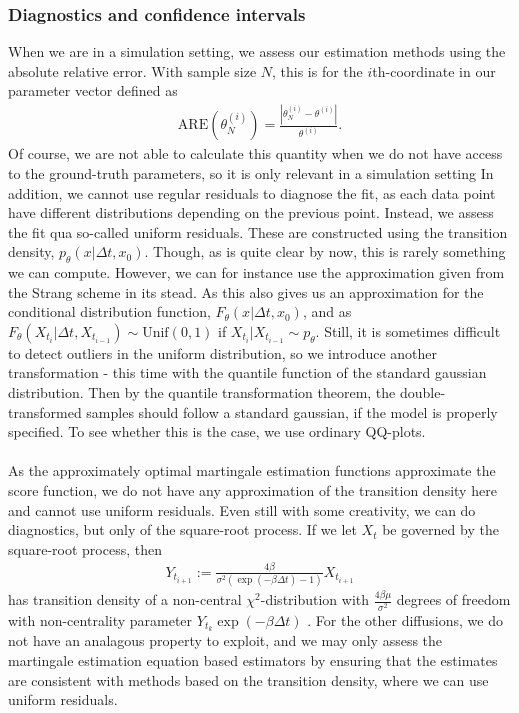 \subsubsection{Diagnostics and confidence intervals}
When we are in a simulation setting, we assess our estimation methods using the absolute relative error. With sample size $N$, this is for the $i$th-coordinate in our parameter vector defined as
\begin{align}
    \mathrm{ARE}\left(\theta_N^{(i)}\right) = \frac{\left|\theta_N^{(i)} - \theta^{(i)}\right|}{\theta^{(i)}}. \label{eq:ARE}
\end{align}
Of course, we are not able to calculate this quantity when we do not have access to the ground-truth parameters, so it is only relevant in a simulation setting In addition, we cannot use regular residuals to diagnose the fit, as each data point have different distributions depending on the previous point. Instead, we assess the fit qua so-called uniform residuals. These are constructed using the transition density, $p_\theta(x|\Delta t, x_0)$. Though, as is quite clear by now, this is rarely something we can compute. However, we can for instance use the approximation given from the Strang scheme in its stead. As this also gives us an approximation for the conditional distribution function, $F_\theta(x|\Delta t, x_0)$, and as $F_\theta(X_{t_{i}}|\Delta t, X_{t_{i - 1}})\sim \mathrm{Unif}(0,1)$ if $X_{t_{i}}|X_{t_{i - 1}} \sim p_\theta$. Still, it is sometimes difficult to detect outliers in the uniform distribution, so we introduce another transformation - this time with the quantile function of the standard gaussian distribution. Then by the quantile transformation theorem, the double-transformed samples should follow a standard gaussian, if the model is properly specified. To see whether this is the case, we use ordinary QQ-plots.\\\\
As the approximately optimal martingale estimation functions approximate the score function, we do not have any approximation of the transition density here and cannot use uniform residuals. Even still with some creativity, we can do diagnostics, but only of the square-root process. If we let $X_t$ be governed by the square-root process, then
\begin{align}
    Y_{t_{i + 1}} := \frac{4\beta}{\sigma^2\left(\exp\left(-\beta \Delta t\right) - 1\right)}X_{t_{i + 1}}
\end{align}
has transition density of a non-central $\chi^2$-distribution with $\frac{4\beta\mu}{\sigma^2}$ degrees of freedom with non-centrality parameter $Y_{t_k}\exp\left(-\beta \Delta t\right)$ \cite[Equation (5.68)]{Srkk2019}. For the other diffusions, we do not have an analagous property to exploit, and we may only assess the martingale estimation equation based estimators by ensuring that the estimates are consistent with methods based on the transition density, where we can use uniform residuals.\\\\
